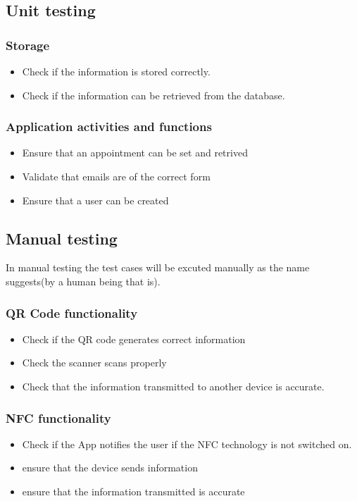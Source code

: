 \documentclass[english]{article}
\begin{document}
	\subsection {Unit testing}
			\subsubsection{Storage}
		\begin{itemize} 
			\item Check if the information is stored correctly.
			\item Check if the information can be retrieved from the database.
		\end{itemize}
			\subsubsection{Application activities and functions}
			\begin{itemize}
				\item Ensure that an appointment can be set and retrived
				\item Validate that emails are of the correct form 
				\item Ensure that a user can be created
			\end{itemize}
	
	\subsection {Manual testing}
	In manual testing the test cases will be excuted manually as the name suggests(by a human being that is). 
		\subsubsection{QR Code functionality}
		\begin{itemize} 
			\item Check if the QR code generates correct information
			\item Check the scanner scans properly
			\item Check that the information transmitted to another device is accurate. 
		\end{itemize}
		
		\subsubsection{NFC functionality}
		\begin{itemize} 
			\item Check if the App notifies the user if the NFC technology is not switched on.
			\item ensure that the device sends information
			\item ensure that the information transmitted is accurate
		\end{itemize}
\end{document}
